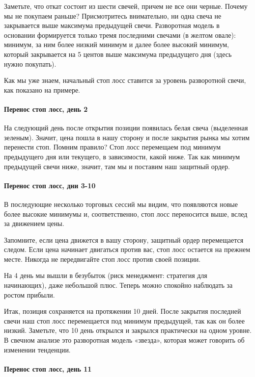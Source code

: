 \documentclass{book}
\begin{document}
Заметьте, что откат состоит из шести свечей, причем не все они черные. Почему мы не покупаем раньше? Присмотритесь внимательно, ни одна свеча не закрывается выше максимума предыдущей свечи. Разворотная модель в основании формируется только тремя последними свечами (в желтом овале): минимум, за ним более низкий минимум и далее более высокий минимум, который закрывается на 5 центов выше максимума предыдущего дня (здесь нужно покупать).

Как мы уже знаем, начальный стоп лосс ставится за уровень разворотной
свечи, как показано на примере.

\paragraph{Перенос стоп лосс, день 2}

На следующий день после открытия позиции появилась белая свеча
(выделенная зеленым). Значит, цена пошла в нашу сторону и после
закрытия рынка мы хотим перенести стоп. Помним правило? Стоп лосс
перемещаем под минимум предыдущего дня или текущего, в зависимости,
какой ниже. Так как минимум предыдущей свечи ниже, значит, там мы и
поставим наш защитный ордер.

\paragraph{Перенос стоп лосс, дни 3-10}

В последующие несколько торговых сессий мы видим, что появляются новые более высокие минимумы и, соответственно, стоп лосс переносится выше, вслед за движением цены.

Запомните, если цена движется в вашу сторону, защитный ордер перемещается следом. Если цена начинает двигаться против вас, стоп лосс остается на прежнем месте. Никогда не передвигайте стоп лосс против своей позиции.

На 4 день мы вышли в безубыток (риск менеджмент: стратегия для начинающих), даже небольшой плюс. Теперь можно спокойно наблюдать за ростом прибыли.

Итак, позиция сохраняется на протяжении 10 дней. После закрытия
последней свечи наш стоп лосс перемещается под минимум предыдущей, так
как он более низкий. Заметьте, что 10 день открылся и закрылся
практически на одном уровне. В свечном анализе это разворотная модель
«звезда», которая может говорить об изменении тенденции.

\paragraph{Перенос стоп лосс, день 11}
\end{document}
